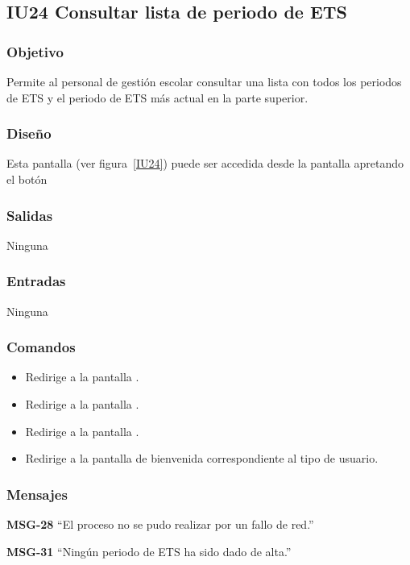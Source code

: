 
\subsection{IU24 Consultar lista de periodo de ETS}
\subsubsection{Objetivo}
   Permite al personal de gestión escolar consultar una lista con todos los periodos de ETS y el periodo de ETS más actual en la parte superior.
\subsubsection{Diseño}
    Esta pantalla  (ver figura~\ref{IU24}) puede ser accedida desde la pantalla  apretando el botón 

\subsubsection{Salidas}
Ninguna
\subsubsection{Entradas}
Ninguna
\subsubsection{Comandos}
\begin{itemize}
    \item {} Redirige a la pantalla .
    \item {} Redirige a la pantalla .
    \item {} Redirige a la pantalla .
    \item {} Redirige a la pantalla de bienvenida correspondiente al tipo de usuario.
    
\end{itemize}

\subsubsection{Mensajes}

\begin{Citemize}
    \item {\bf MSG-28}  ``El proceso no se pudo realizar por un fallo de red.''
    \item {\bf MSG-31}  ``Ningún periodo de ETS ha sido dado de alta.''
\end{Citemize}


